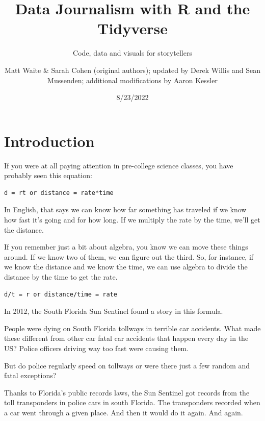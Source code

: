 \documentclass[
  letterpaper,
  DIV=11,
  numbers=noendperiod]{scrreprt}
\title{Data Journalism with R and the Tidyverse}
\subtitle{Code, data and visuals for storytellers}
\author{Matt Waite \& Sarah Cohen (original authors); updated by Derek
Willis and Sean Mussenden; additional modifications by Aaron Kessler}
\date{8/23/2022}
\renewcommand*\contentsname{Table of contents}
\newcommand\contentsname{Table of contents}
\begin{document}
\maketitle
\ifdefined\Shaded\renewenvironment{Shaded}{\begin{tcolorbox}[sharp corners, enhanced, frame hidden, interior hidden, boxrule=0pt, borderline west={3pt}{0pt}{shadecolor}, breakable]}{\end{tcolorbox}}\fi

\renewcommand*\contentsname{Table of contents}
{
\hypersetup{linkcolor=}
\setcounter{tocdepth}{2}
\tableofcontents
}

\hypertarget{introduction}{%
\chapter{Introduction}\label{introduction}}

If you were at all paying attention in pre-college science classes, you
have probably seen this equation:

\begin{verbatim}
d = rt or distance = rate*time
\end{verbatim}

In English, that says we can know how far something has traveled if we
know how fast it's going and for how long. If we multiply the rate by
the time, we'll get the distance.

If you remember just a bit about algebra, you know we can move these
things around. If we know two of them, we can figure out the third. So,
for instance, if we know the distance and we know the time, we can use
algebra to divide the distance by the time to get the rate.

\begin{verbatim}
d/t = r or distance/time = rate
\end{verbatim}

In 2012, the South Florida Sun Sentinel found a story in this formula.

People were dying on South Florida tollways in terrible car accidents.
What made these different from other car fatal car accidents that happen
every day in the US? Police officers driving way too fast were causing
them.

But do police regularly speed on tollways or were there just a few
random and fatal exceptions?

Thanks to Florida's public records laws, the Sun Sentinel got records
from the toll transponders in police cars in south Florida. The
transponders recorded when a car went through a given place. And then it
would do it again. And again.
\end{document}
